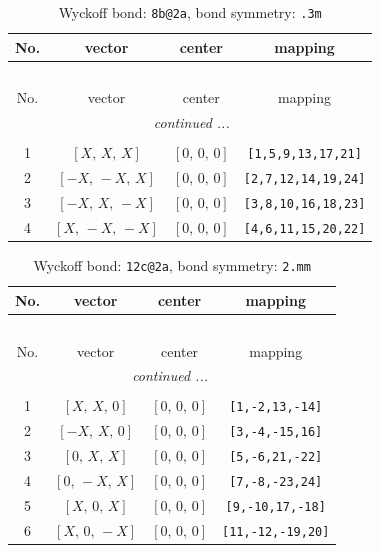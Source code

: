 \documentclass[fleqn,8pt]{jsarticle}
\begin{document}
\begin{longtable}{cccc}
\caption{Wyckoff bond: {\tt 8b@2a}, bond symmetry: {\tt .3m}}
 \\
 \hline \hline
No. & vector & center & mapping \\ \hline \endfirsthead

\multicolumn{3}{l}{\tablename\ \thetable{}} \\
 \hline \hline
No. & vector & center & mapping \\ \hline \endhead

 \hline \hline
\multicolumn{3}{r}{\footnotesize\it continued ...} \\ \endfoot

 \hline \hline
\multicolumn{3}{r}{} \\ \endlastfoot

1 & $\left[ X,\, X,\, X \right]$ & $\left[ 0,\, 0,\, 0 \right]$ & {\tt [1,5,9,13,17,21]} \\ \hline
2 & $\left[ - X,\, - X,\, X \right]$ & $\left[ 0,\, 0,\, 0 \right]$ & {\tt [2,7,12,14,19,24]} \\ \hline
3 & $\left[ - X,\, X,\, - X \right]$ & $\left[ 0,\, 0,\, 0 \right]$ & {\tt [3,8,10,16,18,23]} \\ \hline
4 & $\left[ X,\, - X,\, - X \right]$ & $\left[ 0,\, 0,\, 0 \right]$ & {\tt [4,6,11,15,20,22]} \\
\end{longtable}
\renewcommand{\arraystretch}{1.2}
\begin{longtable}{cccc}
\caption{Wyckoff bond: {\tt 12c@2a}, bond symmetry: {\tt 2.mm}}
 \\
 \hline \hline
No. & vector & center & mapping \\ \hline \endfirsthead

\multicolumn{3}{l}{\tablename\ \thetable{}} \\
 \hline \hline
No. & vector & center & mapping \\ \hline \endhead

 \hline \hline
\multicolumn{3}{r}{\footnotesize\it continued ...} \\ \endfoot

 \hline \hline
\multicolumn{3}{r}{} \\ \endlastfoot

1 & $\left[ X,\, X,\, 0 \right]$ & $\left[ 0,\, 0,\, 0 \right]$ & {\tt [1,-2,13,-14]} \\ \hline
2 & $\left[ - X,\, X,\, 0 \right]$ & $\left[ 0,\, 0,\, 0 \right]$ & {\tt [3,-4,-15,16]} \\ \hline
3 & $\left[ 0,\, X,\, X \right]$ & $\left[ 0,\, 0,\, 0 \right]$ & {\tt [5,-6,21,-22]} \\ \hline
4 & $\left[ 0,\, - X,\, X \right]$ & $\left[ 0,\, 0,\, 0 \right]$ & {\tt [7,-8,-23,24]} \\ \hline
5 & $\left[ X,\, 0,\, X \right]$ & $\left[ 0,\, 0,\, 0 \right]$ & {\tt [9,-10,17,-18]} \\ \hline
6 & $\left[ X,\, 0,\, - X \right]$ & $\left[ 0,\, 0,\, 0 \right]$ & {\tt [11,-12,-19,20]} \\
\end{longtable}
\end{document}
